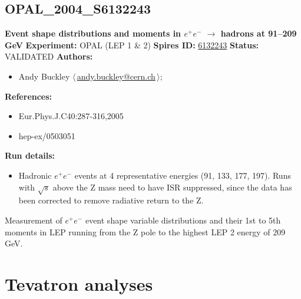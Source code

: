 \subsection[OPAL\_2004\_S6132243]{OPAL\_2004\_S6132243\,\cite{Abbiendi:2004qz}}
\textbf{Event shape distributions and moments in $e^+ e^-$ \ensuremath{\to} hadrons at 91--209 GeV}\newline
\textbf{Experiment:} OPAL (LEP 1 \& 2) \newline
\textbf{Spires ID:} \href{http://www.slac.stanford.edu/spires/find/hep/www?rawcmd=key+6132243}{6132243}\newline
\textbf{Status:} VALIDATED\newline
\textbf{Authors:}
\begin{itemize}
  \item Andy Buckley $\langle\,$\href{mailto:andy.buckley@cern.ch}{andy.buckley@cern.ch}$\,\rangle$;
\end{itemize}
\textbf{References:}
\begin{itemize}
  \item Eur.Phys.J.C40:287-316,2005
  \item hep-ex/0503051
\end{itemize}
\textbf{Run details:}
\begin{itemize}

  \item Hadronic $e^+ e^-$ events at 4 representative energies (91, 133, 177, 197). Runs with \ensuremath{\sqrt{s}} above the Z mass need to have ISR suppressed, since the data has been corrected to remove radiative return to the Z.\end{itemize}

\noindent Measurement of $e^+ e^-$ event shape variable distributions and their 1st  to 5th moments in LEP running from the Z pole to the highest LEP 2 energy of 209 GeV.

\clearpage


\section{Tevatron analyses}
